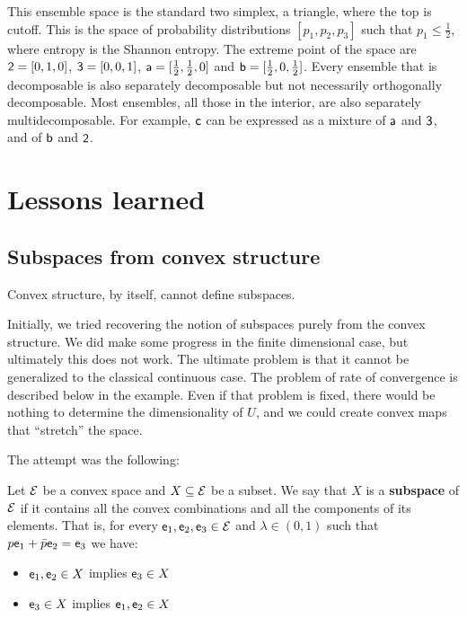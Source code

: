 This ensemble space is the standard two simplex, a triangle, where the top is cutoff. This is the space of probability distributions $[p_1, p_2, p_3]$ such that $p_1 \leq \frac{1}{2}$, where entropy is the Shannon entropy. The extreme point of the space are $\ens[2] = [0,1,0]$, $\ens[3] = [0,0,1]$, $\ens[a] = [\frac{1}{2},\frac{1}{2},0]$ and $\ens[b] = [\frac{1}{2},0,\frac{1}{2}]$. Every ensemble that is decomposable is also separately decomposable but not necessarily orthogonally decomposable. Most ensembles, all those in the interior, are also separately multidecomposable. For example, $\ens[c]$ can be expressed as a mixture of $\ens[a]$ and $\ens[3]$, and of $\ens[b]$ and $\ens[2]$.


\section{Lessons learned}

\subsection{Subspaces from convex structure}

\begin{insight}
	Convex structure, by itself, cannot define subspaces.
\end{insight}

Initially, we tried recovering the notion of subspaces purely from the convex structure. We did make some progress in the finite dimensional case, but ultimately this does not work. The ultimate problem is that it cannot be generalized to the classical continuous case. The problem of rate of convergence is described below in the example. Even if that problem is fixed, there would be nothing to determine the dimensionality of $U$, and we could create convex maps that ``stretch'' the space.

The attempt was the following:

\begin{defn}
	Let $\Ens$ be a convex space and $X \subseteq \Ens$ be a subset. We say that $X$ is a \textbf{subspace} of $\Ens$ if it contains all the convex combinations and all the components of its elements. That is, for every $\ens_1, \ens_2, \ens_3 \in \Ens$ and $\lambda \in (0,1)$ such that $p \ens_1 + \bar{p} \ens_2 = \ens_3$ we have:
	\begin{itemize}
		\item $\ens_1, \ens_2 \in X$ implies $\ens_3 \in X$
		\item $\ens_3 \in X$ implies $\ens_1, \ens_2 \in X$
	\end{itemize}
\end{defn}

